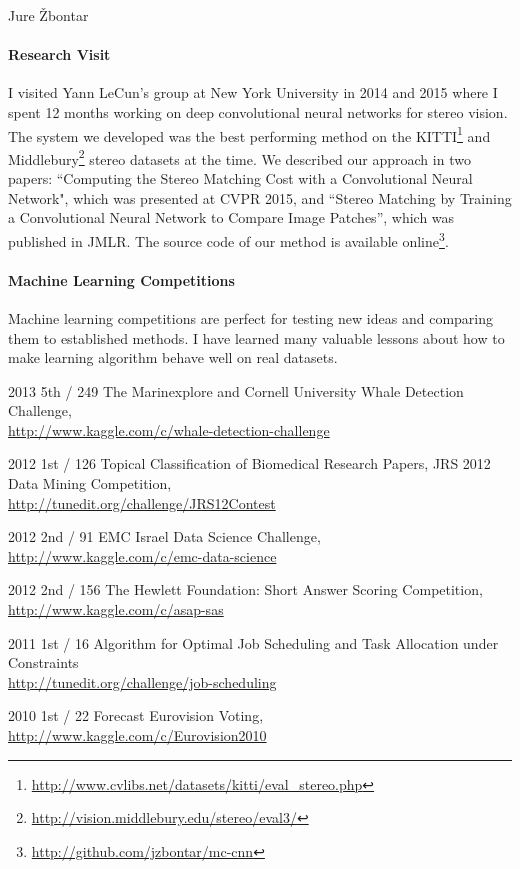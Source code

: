 \documentclass[12pt,a4paper]{article}
\begin{document}
\begin{cv}{Jure \v{Z}bontar}
\begin{cvlist}{}
\end{cvlist}

\paragraph{Research Visit}
I visited Yann LeCun's group at New York University in 2014 and 2015 where I
spent 12 months working on deep convolutional neural networks for stereo
vision. The system we developed was the best performing method on the
KITTI\footnote{\url{http://www.cvlibs.net/datasets/kitti/eval_stereo.php}} and
Middlebury\footnote{\url{http://vision.middlebury.edu/stereo/eval3/}} stereo
datasets at the time. We described our approach in two papers: ``Computing the
Stereo Matching Cost with a Convolutional Neural Network", which was presented
at CVPR 2015, and ``Stereo Matching by Training a Convolutional Neural Network
to Compare Image Patches'', which was published in JMLR. The source code of our
method is available online\footnote{\url{http://github.com/jzbontar/mc-cnn}}.

\paragraph{Machine Learning Competitions}
Machine learning competitions are perfect for testing new ideas and comparing
them to established methods. I have learned many valuable lessons about how to
make learning algorithm behave well on real datasets.

\begin{cvlist}{}
\item[2013 \quad 5th / 249] The Marinexplore and Cornell University Whale Detection 
Challenge, \\
\url{http://www.kaggle.com/c/whale-detection-challenge}
\item[2012 \quad 1st / 126] Topical Classification of Biomedical Research Papers, 
JRS 2012 Data Mining Competition, \\
\url{http://tunedit.org/challenge/JRS12Contest}
\item[2012 \quad 2nd / 91] EMC Israel Data Science Challenge, \\
\url{http://www.kaggle.com/c/emc-data-science}
\item[2012 \quad 2nd / 156] The Hewlett Foundation: Short Answer Scoring 
Competition, \\
\url{http://www.kaggle.com/c/asap-sas}
\item[2011 \quad 1st / 16] Algorithm for Optimal Job Scheduling and Task 
Allocation under Constraints \\
\url{http://tunedit.org/challenge/job-scheduling}
\item[2010 \quad 1st / 22] Forecast Eurovision Voting, \\
\url{http://www.kaggle.com/c/Eurovision2010}
\end{cvlist}


\end{cv}
\end{document}
